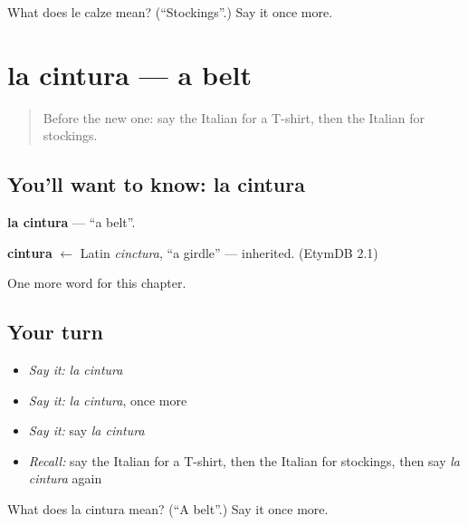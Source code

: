 \begin{tcolorbox}[breakable,colback=teal!4,colframe=teal!35!black,title={Before you move on}]
What does le calze mean? (\textquotedblleft{}Stockings\textquotedblright{}.) Say it once more.
\end{tcolorbox}
\section[la cintura]{la cintura — a belt}

\label{lesson:IT-C220-cintura}



\begin{quote}
Before the new one: say the Italian for a T-shirt, then the Italian for stockings.
\end{quote}

\subsection*{You'll want to know: la cintura}
\textbf{la cintura} — \textquotedblleft{}a belt\textquotedblright{}.

\begin{cousinweb}
\textbf{cintura} $\leftarrow$ Latin \emph{cinctura}, \textquotedblleft{}a girdle\textquotedblright{} — inherited. (EtymDB 2.1)
\end{cousinweb}

\begin{grammarlens}[title={What you've built}]
One more word for this chapter.
\end{grammarlens}

\subsection*{Your turn}
\begin{itemize}
\raggedright
  \item \emph{Say it:} \emph{la cintura}
  \item \emph{Say it:} \emph{la cintura}, once more
  \item \emph{Say it:} say \emph{la cintura}
  \item \emph{Recall:} say the Italian for a T-shirt, then the Italian for stockings, then say \emph{la cintura} again
\end{itemize}

\begin{tcolorbox}[breakable,colback=teal!4,colframe=teal!35!black,title={Before you move on}]
What does la cintura mean? (\textquotedblleft{}A belt\textquotedblright{}.) Say it once more.
\end{tcolorbox}
